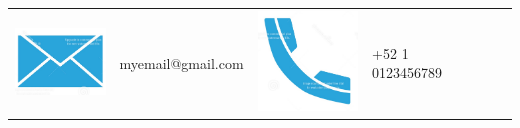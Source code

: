 \documentclass[a4paper,10pt]{article}
\begin{document}
\vspace{-2.5ex}
\begin{table}[H]
\centering

\begin{tabular}{r l | r l | r l | r l}
 \includegraphics[scale=0.017]{icons/email.jpeg} \hspace{-1.3em} & myemail@gmail.com & 
 \includegraphics[scale=0.015]{icons/phone.jpeg} \hspace{-1.3em} & +52 1 0123456789 & 

\end{tabular}
\end{table}
\end{document}
